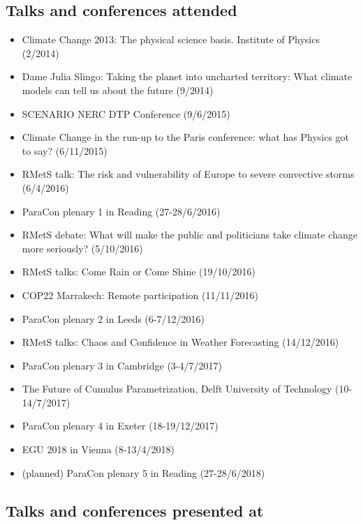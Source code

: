 \documentclass[11pt,a4paper]{article}
\begin{document}
\subsection*{Talks and conferences attended}

\begin{itemize}
  \item Climate Change 2013: The physical science basis. Institute of Physics (2/2014)
  \item Dame Julia Slingo: Taking the planet into uncharted territory: What climate models can tell us about the future (9/2014)
  \item SCENARIO NERC DTP Conference (9/6/2015)
  \item Climate Change in the run-up to the Paris conference: what has Physics got to say? (6/11/2015)
  \item RMetS talk: The risk and vulnerability of Europe to severe convective storms (6/4/2016)
  \item ParaCon plenary 1 in Reading (27-28/6/2016)
  \item RMetS debate: What will make the public and politicians take climate change more seriously? (5/10/2016)
  \item RMetS talks: Come Rain or Come Shine (19/10/2016)
  \item COP22 Marrakech: Remote participation (11/11/2016)
  \item ParaCon plenary 2 in Leeds (6-7/12/2016)
  \item RMetS talks: Chaos and Confidence in Weather Forecasting (14/12/2016)
  \item ParaCon plenary 3 in Cambridge (3-4/7/2017)
  \item The Future of Cumulus Parametrization, Delft University of Technology (10-14/7/2017)
  \item ParaCon plenary 4 in Exeter (18-19/12/2017)
  \item EGU 2018 in Vienna (8-13/4/2018)
  \item (planned) ParaCon plenary 5 in Reading (27-28/6/2018)
\end{itemize}

\subsection*{Talks and conferences presented at}
\end{document}
